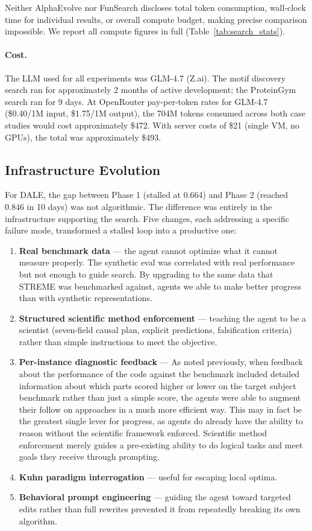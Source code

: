 \documentclass[11pt,a4paper]{article}
\begin{document}
Neither AlphaEvolve nor FunSearch discloses total token consumption, wall-clock time for individual results, or overall compute budget, making precise comparison impossible. We report all compute figures in full (Table~\ref{tab:search_stats}).

\paragraph{Cost.}
The LLM used for all experiments was GLM-4.7 (Z.ai). The motif discovery search ran for approximately 2 months of active development; the ProteinGym search ran for 9 days. At OpenRouter pay-per-token rates for GLM-4.7 (\$0.40/1M input, \$1.75/1M output), the 704M tokens consumed across both case studies would cost approximately \$472. With server costs of \$21 (single VM, no GPUs), the total was approximately \$493.

\subsection{Infrastructure Evolution}

For DALE, the gap between Phase 1 (stalled at 0.664) and Phase 2 (reached 0.846 in 10 days) was not algorithmic. The difference was entirely in the infrastructure supporting the search. Five changes, each addressing a specific failure mode, transformed a stalled loop into a productive one:

\begin{enumerate}
    \item \textbf{Real benchmark data} — the agent cannot optimize what it cannot measure properly. The synthetic eval was correlated with real performance but not enough to guide search.  By upgrading to the same data that STREME was benchmarked against, agents we able to make better progress than with synthetic representations.
    \item \textbf{Structured scientific method enforcement} — teaching the agent to be a scientist (seven-field causal plan, explicit predictions, falsification criteria) rather than simple instructions to meet the objective.
    \item \textbf{Per-instance diagnostic feedback} — As noted previously, when feedback about the performance of the code against the benchmark included detailed information about which parts scored higher or lower on the target subject benchmark rather than just a simple score, the agents were able to augment their follow on approaches in a much more efficient way.  This may in fact be the greatest single lever for progress, as agents do already have the ability to reason without the scientific framework enforced.  Scientific method enforcement merely guides a pre-existing ability to do logical tasks and meet goals they receive through prompting.
    \item \textbf{Kuhn paradigm interrogation} — useful for escaping local optima.
    \item \textbf{Behavioral prompt engineering} — guiding the agent toward targeted edits rather than full rewrites prevented it from repeatedly breaking its own algorithm.
\end{enumerate}
\end{document}
